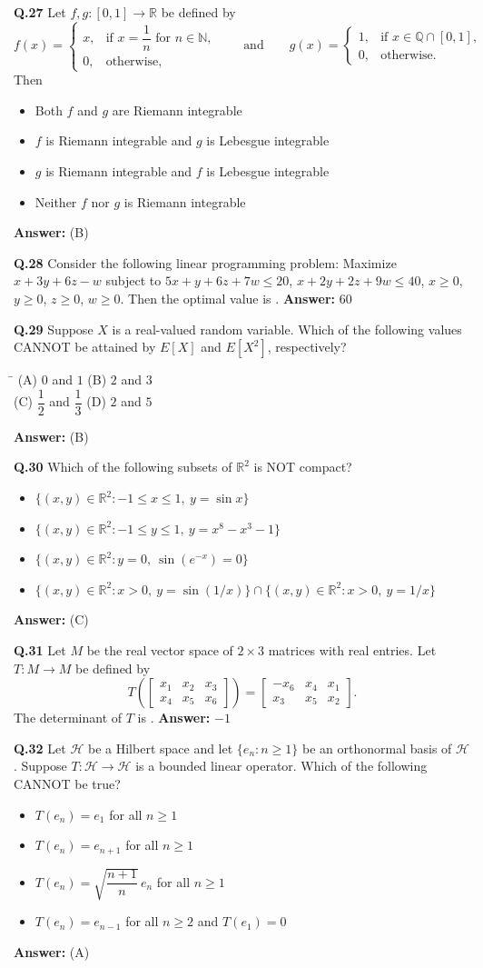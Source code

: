 \documentclass[11pt,a4paper]{article}
\newcommand{\optsfourA}[4]{%
  \begin{tabbing}
    \hspace{0.48\linewidth}\=\kill
    (A) #1 \> (B) #2 \\[2pt]
    (C) #3 \> (D) #4
  \end{tabbing}%
}
\newcommand{\optslistA}[4]{%
  \begin{itemize}
    \setlength{\itemsep}{2pt}\setlength{\parskip}{0pt}
    \item[(A)] #1
    \item[(B)] #2
    \item[(C)] #3
    \item[(D)] #4
  \end{itemize}%
}
\newcommand{\ans}[1]{\textbf{Answer:} #1\par\medskip}
\begin{document}
\textbf{Q.27} Let $f, g : [0, 1] \to \mathbb{R}$ be defined by
\[
  f(x) = \begin{cases} x, & \text{if } x = \dfrac{1}{n} \text{ for } n \in \mathbb{N}, \\ 0, & \text{otherwise,} \end{cases}
  \qquad \text{and} \qquad
  g(x) = \begin{cases} 1, & \text{if } x \in \mathbb{Q} \cap [0, 1], \\ 0, & \text{otherwise.} \end{cases}
\]
Then
\optslistA{Both $f$ and $g$ are Riemann integrable}{$f$ is Riemann integrable and $g$ is Lebesgue integrable}{$g$ is Riemann integrable and $f$ is Lebesgue integrable}{Neither $f$ nor $g$ is Riemann integrable}
\ans{(B)}

\textbf{Q.28} Consider the following linear programming problem: Maximize $x + 3y + 6z - w$ subject to $5x + y + 6z + 7w \le 20$, $x + 2y + 2z + 9w \le 40$, $x \ge 0$, $y \ge 0$, $z \ge 0$, $w \ge 0$. Then the optimal value is \underline{\hspace{2cm}}.
\ans{$60$}

\textbf{Q.29} Suppose $X$ is a real-valued random variable. Which of the following values CANNOT be attained by $E[X]$ and $E[X^2]$, respectively?
\optsfourA{$0$ and $1$}{$2$ and $3$}{$\dfrac{1}{2}$ and $\dfrac{1}{3}$}{$2$ and $5$}
\ans{(B)}

\textbf{Q.30} Which of the following subsets of $\mathbb{R}^2$ is NOT compact?
\optslistA{$\{(x, y) \in \mathbb{R}^2 : -1 \le x \le 1,\ y = \sin x\}$}{$\{(x, y) \in \mathbb{R}^2 : -1 \le y \le 1,\ y = x^8 - x^3 - 1\}$}{$\{(x, y) \in \mathbb{R}^2 : y = 0,\ \sin(e^{-x}) = 0\}$}{$\{(x, y) \in \mathbb{R}^2 : x > 0,\ y = \sin(1/x)\} \cap \{(x, y) \in \mathbb{R}^2 : x > 0,\ y = 1/x\}$}
\ans{(C)}

\textbf{Q.31} Let $M$ be the real vector space of $2 \times 3$ matrices with real entries. Let $T : M \to M$ be defined by
\[
  T\!\left(\begin{bmatrix} x_1 & x_2 & x_3 \\ x_4 & x_5 & x_6 \end{bmatrix}\right) = \begin{bmatrix} -x_6 & x_4 & x_1 \\ x_3 & x_5 & x_2 \end{bmatrix}.
\]
The determinant of $T$ is \underline{\hspace{2cm}}.
\ans{$-1$}

\textbf{Q.32} Let $\mathcal{H}$ be a Hilbert space and let $\{e_n : n \ge 1\}$ be an orthonormal basis of $\mathcal{H}$. Suppose $T : \mathcal{H} \to \mathcal{H}$ is a bounded linear operator. Which of the following CANNOT be true?
\optslistA{$T(e_n) = e_1$ for all $n \ge 1$}{$T(e_n) = e_{n+1}$ for all $n \ge 1$}{$T(e_n) = \sqrt{\dfrac{n + 1}{n}}\,e_n$ for all $n \ge 1$}{$T(e_n) = e_{n-1}$ for all $n \ge 2$ and $T(e_1) = 0$}
\ans{(A)}
\end{document}
